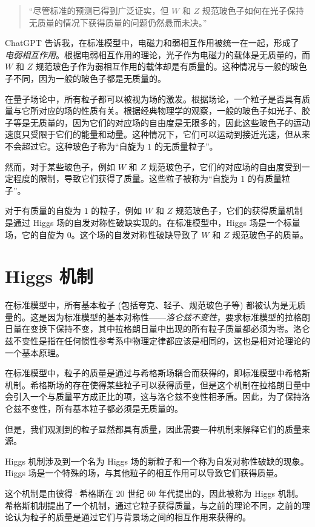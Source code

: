 \documentclass[oneside,a4paper,openany,11pt]{ctexbook}
\begin{document}
\begin{quote}
    “尽管标准的预测已得到广泛证实，但 $W$ 和 $Z$ 规范玻色子如何在光子保持无质量的情况下获得质量的问题仍然悬而未决。”
\end{quote}

ChatGPT 告诉我，在标准模型中，电磁力和弱相互作用被统一在一起，形成了 \emph{电弱相互作用}。根据电弱相互作用的理论，光子作为电磁力的载体是无质量的，而 $W$ 和 $Z$ 规范玻色子作为弱相互作用的载体却是有质量的。这种情况与一般的玻色子不同，因为一般的玻色子都是无质量的。

在量子场论中，所有粒子都可以被视为场的激发。根据场论，一个粒子是否具有质量与它所对应的场的性质有关。根据经典物理学的观察，一般的玻色子如光子、胶子等是无质量的，因为它们的对应场的自由度是无限多的，因此这些玻色子的运动速度只受限于它们的能量和动量。这种情况下，它们可以运动到接近光速，但从来不会超过它。这种玻色子称为“自旋为 $1$ 的无质量粒子”。

然而，对于某些玻色子，例如 $W$ 和 $Z$ 规范玻色子，它们的对应场的自由度受到一定程度的限制，导致它们获得了质量。这些粒子被称为“自旋为 $1$ 的有质量粒子”。

对于有质量的自旋为 $1$ 的粒子，例如 $W$ 和 $Z$ 规范玻色子，它们的获得质量机制是通过 Higgs 场的自发对称性破缺实现的。在标准模型中，Higgs 场是一个标量场，它的自旋为 $0$。这个场的自发对称性破缺导致了 $W$ 和 $Z$ 规范玻色子的质量。

\section{Higgs 机制}

在标准模型中，所有基本粒子 (包括夸克、轻子、规范玻色子等) 都被认为是无质量的。这是因为标准模型的基本对称性——\emph{洛仑兹不变性}，要求标准模型的拉格朗日量在变换下保持不变，其中拉格朗日量中出现的所有粒子质量都必须为零。洛仑兹不变性是指在任何惯性参考系中物理定律都应该是相同的，这也是相对论理论的一个基本原理。

在标准模型中，粒子的质量是通过与希格斯场耦合而获得的，即标准模型中希格斯机制。希格斯场的存在使得某些粒子可以获得质量，但是这个机制在拉格朗日量中会引入一个与质量平方成正比的项，这与洛仑兹不变性相矛盾。因此，为了保持洛仑兹不变性，所有基本粒子都必须是无质量的。

但是，我们观测到的粒子显然都具有质量，因此需要一种机制来解释它们的质量来源。

Higgs 机制涉及到一个名为 Higgs 场的新粒子和一个称为自发对称性破缺的现象。Higgs 场是一个特殊的场，与其他粒子的相互作用可以导致它们获得质量。

这个机制是由彼得·希格斯在 20 世纪 60 年代提出的，因此被称为 Higgs 机制。希格斯机制提出了一个机制，通过它粒子获得质量，与之前的理论不同，之前的理论认为粒子的质量是通过它们与背景场之间的相互作用来获得的。
\end{document}
